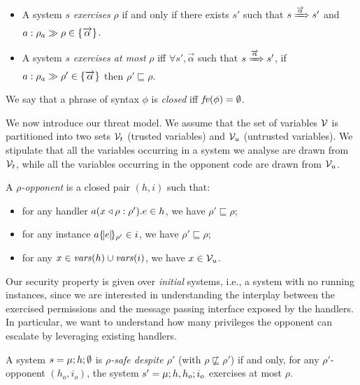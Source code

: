 \begin{definition}[Exercise]
\label{def:exercise}
\mbox{ }
\begin{itemize}
\item A system $s$ \emph{exercises} $\rho$ if and only if there exists
  $s'$ such that $s \xRa{\vec{\alpha}} s'$ and $\labex{a}{\rho_a}{\rho} \in
  \{\vec{\alpha}\}$. 
\item A system $s$ \emph{exercises at most} $\rho$ iff
$\forall s',\vec{\alpha}$ such that $s\xRa{\vec{\alpha}}s'$, if
$\labex{a}{\rho_a}{\rho'}\in \{\vec{\alpha}\}$ then $\rho'\sqsubseteq\rho$.
\end{itemize}
\end{definition}

\noindent We say that a phrase of syntax $\phi$ is \emph{closed} iff $\fv(\phi) = \emptyset$.

We now introduce our threat model. We assume that the set of variables $\vars$ is partitioned into two sets $\vars_t$ (trusted variables) and $\vars_u$ (untrusted variables). We stipulate that all the variables occurring in a system we analyse are drawn from $\vars_t$, while all the variables occurring in the opponent code are drawn from $\vars_u$.

\begin{definition}[Opponent]
\label{def:opponent}
A \emph{$\rho$-opponent} is a closed pair $(h,i)$ such that:
\begin{itemize}
\item for any handler $\handler{a}{x}{\rho}{e}{\rho'} \in h$, we have $\rho' \sqsubseteq \rho$;
\item for any instance $\inst{a}{e}{\rho'} \in i$, we have $\rho' \sqsubseteq \rho$;
\item for any $x \in \fvbv(h) \cup \fvbv(i)$, we have $x \in \vars_u$.
\end{itemize}
\end{definition}

Our security property is given over \emph{initial} systems, i.e., a system with no running instances, since we are interested in understanding the interplay between the exercised permissions and the message passing interface exposed by the handlers. In particular, we want to understand how many privileges the opponent can escalate by leveraging existing handlers.

\begin{definition}
\label{def:safety}
A system $s = \sys{\mu}{h}{\emptyset}$ is \emph{$\rho$-safe despite $\rho'$} (with $\rho \not\sqsubseteq \rho'$) if and only, for any $\rho'$-opponent $(h_o,i_o)$, the system $s' = \sys{\mu}{h,h_o}{i_o}$ exercises at most $\rho$.
\end{definition}

